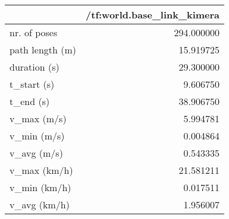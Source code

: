 \begin{tabular}{lr}
\toprule
{} &  /tf:world.base\_link\_kimera \\
\midrule
nr. of poses    &                  294.000000 \\
path length (m) &                   15.919725 \\
duration (s)    &                   29.300000 \\
t\_start (s)     &                    9.606750 \\
t\_end (s)       &                   38.906750 \\
v\_max (m/s)     &                    5.994781 \\
v\_min (m/s)     &                    0.004864 \\
v\_avg (m/s)     &                    0.543335 \\
v\_max (km/h)    &                   21.581211 \\
v\_min (km/h)    &                    0.017511 \\
v\_avg (km/h)    &                    1.956007 \\
\bottomrule
\end{tabular}
